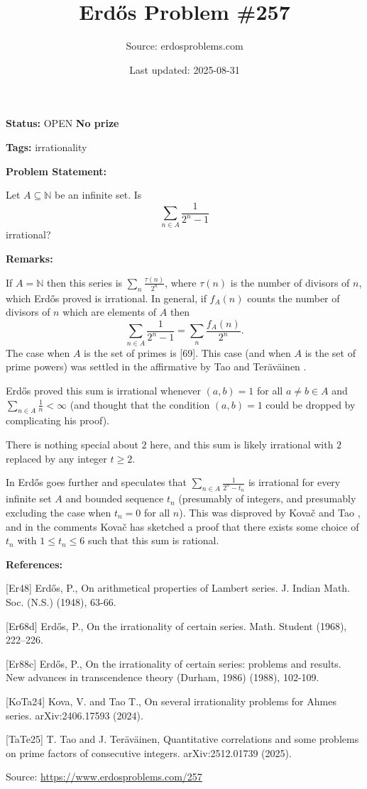 \documentclass{article}
\title{Erd\H{o}s Problem \#257}
\date{Last updated: 2025-08-31}
\author{Source: erdosproblems.com}
\begin{document}
\maketitle

\noindent\textbf{Status:} OPEN \quad \textbf{No prize}

\noindent\textbf{Tags:} irrationality

\medskip
\noindent\textbf{Problem Statement:}

Let $A\subseteq \mathbb{N}$ be an infinite set. Is\[\sum_{n\in A}\frac{1}{2^n-1}\]irrational?

\bigskip
\noindent\textbf{Remarks:}

If $A=\mathbb{N}$ then this series is $\sum_{n}\frac{\tau(n)}{2^n}$, where $\tau(n)$ is the number of divisors of $n$, which Erd\H{o}s \cite{Er48} proved is irrational. In general, if $f_A(n)$ counts the number of divisors of $n$ which are elements of $A$ then\[\sum_{n\in A}\frac{1}{2^n-1}=\sum_n \frac{f_A(n)}{2^n}.\]The case when $A$ is the set of primes is [69]. This case (and when $A$ is the set of prime powers) was settled in the affirmative by Tao and Ter\"{a}v\"{a}inen \cite{TaTe25}.

Erd\H{o}s \cite{Er68d} proved this sum is irrational whenever $(a,b)=1$ for all $a\neq b\in A$ and $\sum_{n\in A}\frac{1}{n}<\infty$ (and thought that the condition $(a,b)=1$ could be dropped by complicating his proof).

There is nothing special about $2$ here, and this sum is likely irrational with $2$ replaced by any integer $t\geq 2$.

In \cite{Er88c} Erd\H{o}s goes further and speculates that $\sum_{n\in A}\frac{1}{2^n-t_n}$ is irrational for every infinite set $A$ and bounded sequence $t_n$ (presumably of integers, and presumably excluding the case when $t_n=0$ for all $n$). This was disproved by Kova\v{c} and Tao \cite{KoTa24}, and in the comments Kova\v{c} has sketched a proof that there exists some choice of $t_n$ with $1\leq t_n\leq 6$ such that this sum is rational.

\bigskip
\noindent\textbf{References:}

[Er48] Erd\H{o}s, P., On arithmetical properties of Lambert series. J. Indian Math. Soc. (N.S.) (1948), 63-66.
 
 [Er68d] Erd\H{o}s, P., On the irrationality of certain series. Math. Student (1968), 222--226.
 
 [Er88c] Erd\H{o}s, P., On the irrationality of certain series: problems and results. New advances in transcendence theory (Durham, 1986) (1988), 102-109.
 
 [KoTa24] Kova\vC, V. and Tao T., On several irrationality problems for Ahmes series. arXiv:2406.17593 (2024).
 
 [TaTe25] T. Tao and J. Ter\"{a}v\"{a}inen, Quantitative correlations and some problems on prime factors of consecutive integers. arXiv:2512.01739 (2025).

\bigskip
\noindent\small{Source: \url{https://www.erdosproblems.com/257}}
\end{document}
